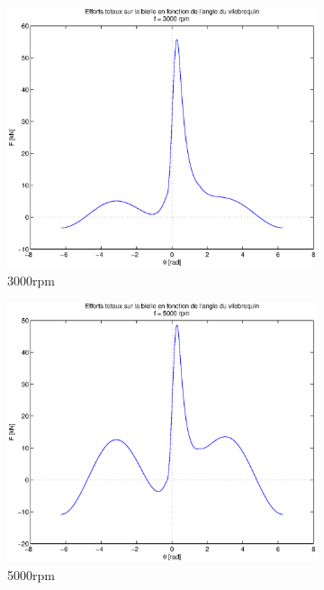 \documentclass{article}
\begin{document}
\begin{figure}[h!]
\centering
    \begin{subfigure}[b]{0.45\textwidth}
    				\includegraphics[scale=0.4]{Schema/forces_tot_3000rpm.eps}
                \caption{\unit{3000}{rpm}}
                \label{fig:forces_tot_3000rpm}
    \end{subfigure}
    \begin{subfigure}[b]{0.45\textwidth}
                \includegraphics[scale=0.4]{Schema/forces_tot_5000rpm.eps}
                \caption{\unit{5000}{rpm}}
                \label{fig:forces_tot_5000rpm}
    \end{subfigure}
    \caption{}
\end{figure}
\end{document}
